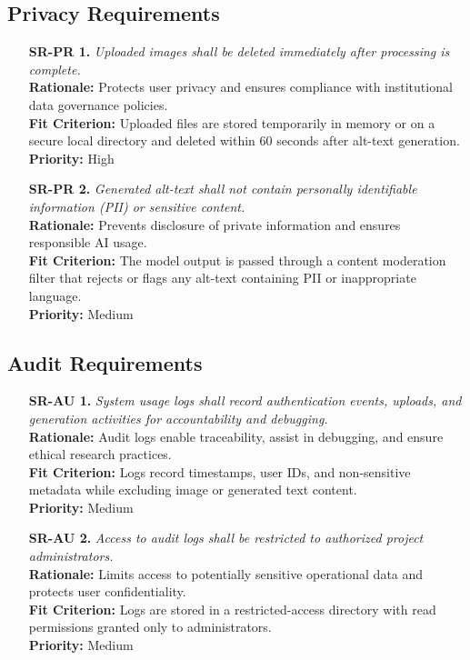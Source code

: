 \documentclass[12pt]{article}
\begin{document}
\subsection{Privacy Requirements}
\begin{itemize}
    \item[\textbf{SR-PR 1.}] \textit{Uploaded images shall be deleted immediately after processing is complete.}\\
    \textbf{Rationale:} Protects user privacy and ensures compliance with institutional data governance policies.\\
    \textbf{Fit Criterion:} Uploaded files are stored temporarily in memory or on a secure local directory and deleted within 60 seconds after alt-text generation.\\
    \textbf{Priority:} High

    \item[\textbf{SR-PR 2.}] \textit{Generated alt-text shall not contain personally identifiable information (PII) or sensitive content.}\\
    \textbf{Rationale:} Prevents disclosure of private information and ensures responsible AI usage.\\
    \textbf{Fit Criterion:} The model output is passed through a content moderation filter that rejects or flags any alt-text containing PII or inappropriate language.\\
    \textbf{Priority:} Medium
\end{itemize}

\subsection{Audit Requirements}
\begin{itemize}
    \item[\textbf{SR-AU 1.}] \textit{System usage logs shall record authentication events, uploads, and generation activities for accountability and debugging.}\\
    \textbf{Rationale:} Audit logs enable traceability, assist in debugging, and ensure ethical research practices.\\
    \textbf{Fit Criterion:} Logs record timestamps, user IDs, and non-sensitive metadata while excluding image or generated text content.\\
    \textbf{Priority:} Medium

    \item[\textbf{SR-AU 2.}] \textit{Access to audit logs shall be restricted to authorized project administrators.}\\
    \textbf{Rationale:} Limits access to potentially sensitive operational data and protects user confidentiality.\\
    \textbf{Fit Criterion:} Logs are stored in a restricted-access directory with read permissions granted only to administrators.\\
    \textbf{Priority:} Medium
\end{itemize}
\end{document}
